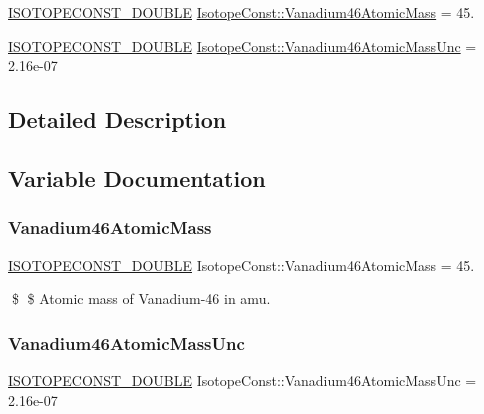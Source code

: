 \begin{DoxyCompactItemize}
\item 
\mbox{\hyperlink{group___isotope_const-_macros_ga8f45a7272ce02c0b4c65c44636ed719a}{I\+S\+O\+T\+O\+P\+E\+C\+O\+N\+S\+T\+\_\+\+D\+O\+U\+B\+LE}} \mbox{\hyperlink{group___isotope_const-_vanadium-_v46_gad5760da589320483eeb8f8d8c253f99a}{Isotope\+Const\+::\+Vanadium46\+Atomic\+Mass}} = 45.
\item 
\mbox{\hyperlink{group___isotope_const-_macros_ga8f45a7272ce02c0b4c65c44636ed719a}{I\+S\+O\+T\+O\+P\+E\+C\+O\+N\+S\+T\+\_\+\+D\+O\+U\+B\+LE}} \mbox{\hyperlink{group___isotope_const-_vanadium-_v46_gabaf0bb25a66954d7f99f21cff833f3fb}{Isotope\+Const\+::\+Vanadium46\+Atomic\+Mass\+Unc}} = 2.\+16e-\/07
\end{DoxyCompactItemize}


\subsection{Detailed Description}


\subsection{Variable Documentation}
\mbox{\label{group___isotope_const-_vanadium-_v46_gad5760da589320483eeb8f8d8c253f99a}} 
\subsubsection{\texorpdfstring{Vanadium46\+Atomic\+Mass}{Vanadium46AtomicMass}}
{\footnotesize\ttfamily \mbox{\hyperlink{group___isotope_const-_macros_ga8f45a7272ce02c0b4c65c44636ed719a}{I\+S\+O\+T\+O\+P\+E\+C\+O\+N\+S\+T\+\_\+\+D\+O\+U\+B\+LE}} Isotope\+Const\+::\+Vanadium46\+Atomic\+Mass = 45.}

\$ \$ Atomic mass of Vanadium-\/46 in amu. \mbox{\label{group___isotope_const-_vanadium-_v46_gabaf0bb25a66954d7f99f21cff833f3fb}} 
\subsubsection{\texorpdfstring{Vanadium46\+Atomic\+Mass\+Unc}{Vanadium46AtomicMassUnc}}
{\footnotesize\ttfamily \mbox{\hyperlink{group___isotope_const-_macros_ga8f45a7272ce02c0b4c65c44636ed719a}{I\+S\+O\+T\+O\+P\+E\+C\+O\+N\+S\+T\+\_\+\+D\+O\+U\+B\+LE}} Isotope\+Const\+::\+Vanadium46\+Atomic\+Mass\+Unc = 2.\+16e-\/07}

